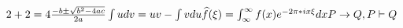 $2 + 2 = 4\\
\frac{-b \pm \sqrt{b^2 - 4ac} }{2a} \\
\int udv = uv - \int vdu \\
\widehat{f}(\xi) = \int_{\infty}^\infty f(x)e^{-2\pi*ix \xi}dx\\
P \rightarrow Q, P \vdash Q
$

